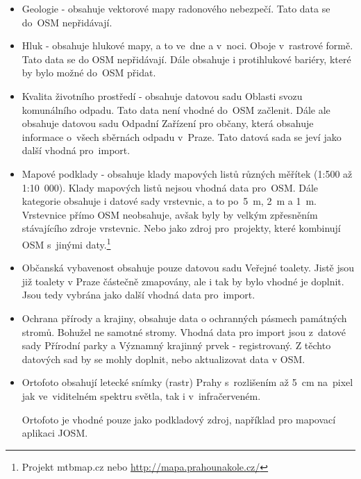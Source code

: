 \begin{itemize}
    \item   Geologie - obsahuje vektorové mapy radonového nebezpečí.
            Tato data se do~OSM nepřidávají.

    \item   Hluk - obsahuje hlukové mapy, a to ve~dne a v~noci. Oboje
            v~rastrové formě. Tato data se do OSM nepřidávají. Dále
            obsahuje i protihlukové bariéry, které by bylo možné
            do~OSM přidat.

    \item   Kvalita životního prostředí - obsahuje datovou sadu
            Oblasti svozu komunálního odpadu. Tato data není vhodné
            do~OSM začlenit. Dále ale obsahuje datovou sadu
            Odpadní Zařízení pro občany, která obsahuje informace
            o~všech sběrnách odpadu v~Praze. Tato datová sada se jeví
            jako další vhodná pro~import.

    \item   Mapové podklady - obsahuje klady mapových listů různých
            měřítek (1:500 až 1:10~000). Klady mapových listů nejsou
            vhodná data pro~OSM. Dále kategorie obsahuje i datové sady
            vrstevnic, a to po~5~m, 2~m a 1~m. Vrstevnice přímo OSM
            neobsahuje, avšak byly by velkým zpřesněním stávajícího
            zdroje vrstevnic. Nebo jako zdroj pro~projekty, které
            kombinují OSM s~jinými daty.\footnote{Projekt mtbmap.cz nebo \url{http://mapa.prahounakole.cz/}}

    \item   Občanská vybavenost obsahuje pouze datovou sadu Veřejné
            toalety. Jistě jsou již toalety v Praze částečně
            zmapovány, ale i tak by bylo vhodné je doplnit. Jsou tedy
            vybrána jako další vhodná data pro~import.

    \item   Ochrana přírody a krajiny, obsahuje data o ochranných
            pásmech památných stromů. Bohužel ne samotné stromy.
            Vhodná data pro import jsou z~datové sady Přírodní parky a
            Významný krajinný prvek - registrovaný. Z těchto datových
            sad by se mohly doplnit, nebo aktualizovat data v OSM.

    \item   Ortofoto obsahují letecké snímky (rastr) Prahy 
            s~rozlišením až 5~cm na~pixel jak ve~viditelném spektru
            světla, tak i v~infračerveném.

            Ortofoto je vhodné pouze jako podkladový zdroj,
            například pro mapovací aplikaci JOSM.


\end{itemize}

